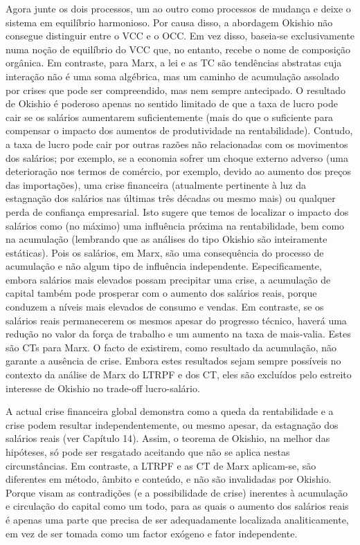  \par 
Agora junte os dois processos, um ao outro como processos de mudança e deixe o sistema em equilíbrio harmonioso. Por causa disso, a abordagem Okishio não consegue distinguir entre o VCC e o OCC. Em vez disso, baseia-se exclusivamente numa noção de equilíbrio do VCC que, no entanto, recebe o nome de composição orgânica. Em contraste, para Marx, a lei e as TC são tendências abstratas cuja interação não é uma soma algébrica, mas um caminho de acumulação assolado por crises que pode ser compreendido, mas nem sempre antecipado. O resultado de Okishio é poderoso apenas no sentido limitado de que a taxa de lucro pode cair se os salários aumentarem suficientemente (mais do que o suficiente para compensar o impacto dos aumentos de produtividade na rentabilidade). Contudo, a taxa de lucro pode cair por outras razões não relacionadas com os movimentos dos salários; por exemplo, se a economia sofrer um choque externo adverso (uma deterioração nos termos de comércio, por exemplo, devido ao aumento dos preços das importações), uma crise financeira (atualmente pertinente à luz da estagnação dos salários nas últimas três décadas ou mesmo mais) ou qualquer perda de confiança empresarial. Isto sugere que temos de localizar o impacto dos salários como (no máximo) uma influência próxima na rentabilidade, bem como na acumulação (lembrando que as análises do tipo Okishio são inteiramente estáticas). Pois os salários, em Marx, são uma consequência do processo de acumulação e não algum tipo de influência independente. Especificamente, embora salários mais elevados possam precipitar uma crise, a acumulação de capital também pode prosperar com o aumento dos salários reais, porque conduzem a níveis mais elevados de consumo e vendas. Em contraste, se os salários reais permanecerem os mesmos apesar do progresso técnico, haverá uma redução no valor da força de trabalho e um aumento na taxa de mais-valia. Estes são CTs para Marx. O facto de existirem, como resultado da acumulação, não garante a ausência de crise. Embora estes resultados sejam sempre possíveis no contexto da análise de Marx do LTRPF e dos CT, eles são excluídos pelo estreito interesse de Okishio no trade-off lucro-salário.
 \par 
A actual crise financeira global demonstra como a queda da rentabilidade e a crise podem resultar independentemente, ou mesmo apesar, da estagnação dos salários reais (ver Capítulo {\color{blue}14}). Assim, o teorema de Okishio, na melhor das hipóteses, só pode ser resgatado aceitando que não se aplica nestas circunstâncias. Em contraste, a LTRPF e as CT de Marx aplicam-se, são diferentes em método, âmbito e conteúdo, e não são invalidadas por Okishio. Porque visam as contradições (e a possibilidade de crise) inerentes à acumulação e circulação do capital como um todo, para as quais o aumento dos salários reais é apenas uma parte que precisa de ser adequadamente localizada analiticamente, em vez de ser tomada como um factor exógeno e fator independente.
 \par 
